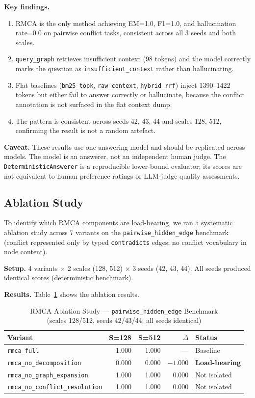\documentclass[conference]{IEEEtran}
\begin{document}
\textbf{Key findings.}
\begin{enumerate}
\item RMCA is the only method achieving EM=1.0, F1=1.0, and hallucination rate=0.0 on
pairwise conflict tasks, consistent across all 3 seeds and both scales.
\item \texttt{query\_graph} retrieves insufficient context (98 tokens) and the model
correctly marks the question as \texttt{insufficient\_context} rather than hallucinating.
\item Flat baselines (\texttt{bm25\_topk}, \texttt{raw\_context}, \texttt{hybrid\_rrf})
inject 1390--1422 tokens but either fail to answer correctly or hallucinate, because the
conflict annotation is not surfaced in the flat context dump.
\item The pattern is consistent across seeds 42, 43, 44 and scales 128, 512, confirming
the result is not a random artefact.
\end{enumerate}

\textbf{Caveat.} These results use one answering model and should be replicated across
models. The model is an answerer, not an independent human judge. The
\texttt{DeterministicAnswerer} is a reproducible lower-bound evaluator; its scores are not
equivalent to human preference ratings or LLM-judge quality assessments.

\subsection{Ablation Study}

To identify which RMCA components are load-bearing, we ran a systematic ablation study
across 7 variants on the \texttt{pairwise\_hidden\_edge} benchmark (conflict represented
only by typed \texttt{contradicts} edges; no conflict vocabulary in node content).

\textbf{Setup.} 4 variants $\times$ 2 scales (128, 512) $\times$ 3 seeds (42, 43, 44).
All seeds produced identical scores (deterministic benchmark).

\textbf{Results.} Table~\ref{tab:ablation} shows the ablation results.

\begin{table}[htbp]
\caption{RMCA Ablation Study --- \texttt{pairwise\_hidden\_edge} Benchmark\\
(scales 128/512, seeds 42/43/44; all seeds identical)}
\label{tab:ablation}
\centering
\begin{tabular}{lrrrp{2.0cm}}
\toprule
\textbf{Variant} & \textbf{S=128} & \textbf{S=512} & \textbf{$\Delta$} & \textbf{Status} \\
\midrule
\texttt{rmca\_full}               & 1.000 & 1.000 & ---    & Baseline \\
\texttt{rmca\_no\_decomposition}  & 0.000 & 0.000 & $-1.000$ & \textbf{Load-bearing} \\
\texttt{rmca\_no\_graph\_expansion} & 1.000 & 1.000 & 0.000 & Not isolated \\
\texttt{rmca\_no\_conflict\_resolution} & 1.000 & 1.000 & 0.000 & Not isolated \\
\bottomrule
\end{tabular}
\end{table}
\end{document}
